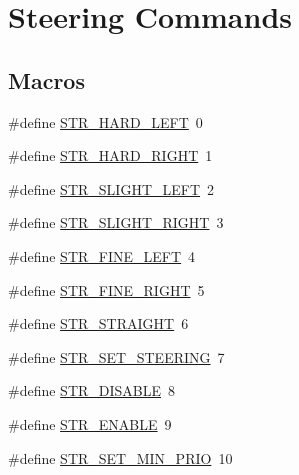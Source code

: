\hypertarget{group__steering__commands}{\section{Steering Commands}
\label{group__steering__commands}
}
\subsection*{Macros}
\begin{DoxyCompactItemize}
\item 
\#define \hyperlink{group__steering__commands_ga0c1cb6fd30382725c9828e619d0d813c}{S\-T\-R\-\_\-\-H\-A\-R\-D\-\_\-\-L\-E\-F\-T}~0
\item 
\#define \hyperlink{group__steering__commands_ga9460f3ea1c94d0cbea0651cea23a6b90}{S\-T\-R\-\_\-\-H\-A\-R\-D\-\_\-\-R\-I\-G\-H\-T}~1
\item 
\#define \hyperlink{group__steering__commands_ga0bf8759a57b2161c90c56b4186545018}{S\-T\-R\-\_\-\-S\-L\-I\-G\-H\-T\-\_\-\-L\-E\-F\-T}~2
\item 
\#define \hyperlink{group__steering__commands_ga7872976a47fb31b04cb5c4328d0b3779}{S\-T\-R\-\_\-\-S\-L\-I\-G\-H\-T\-\_\-\-R\-I\-G\-H\-T}~3
\item 
\#define \hyperlink{group__steering__commands_gaea8bf1d4bcf9c8b6bfd778fb81f91eab}{S\-T\-R\-\_\-\-F\-I\-N\-E\-\_\-\-L\-E\-F\-T}~4
\item 
\#define \hyperlink{group__steering__commands_ga97aef886486d06481892129ac63b29ba}{S\-T\-R\-\_\-\-F\-I\-N\-E\-\_\-\-R\-I\-G\-H\-T}~5
\item 
\#define \hyperlink{group__steering__commands_ga85d1e93794cb6ca3f82ba6b211897ac6}{S\-T\-R\-\_\-\-S\-T\-R\-A\-I\-G\-H\-T}~6
\item 
\#define \hyperlink{group__steering__commands_ga3944f02514d51b9a5fad5def73a3d492}{S\-T\-R\-\_\-\-S\-E\-T\-\_\-\-S\-T\-E\-E\-R\-I\-N\-G}~7
\item 
\#define \hyperlink{group__steering__commands_gafee4d732bb6cb1141150ea6c07a4cf7e}{S\-T\-R\-\_\-\-D\-I\-S\-A\-B\-L\-E}~8
\item 
\#define \hyperlink{group__steering__commands_gac780e9695ae28682e0fe8bacf39ad828}{S\-T\-R\-\_\-\-E\-N\-A\-B\-L\-E}~9
\item 
\#define \hyperlink{group__steering__commands_ga835096a68148ab4e00856d74db7dafbc}{S\-T\-R\-\_\-\-S\-E\-T\-\_\-\-M\-I\-N\-\_\-\-P\-R\-I\-O}~10
\end{DoxyCompactItemize}


